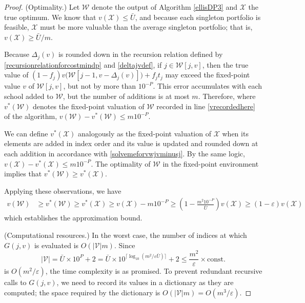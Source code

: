 \documentclass[12pt]{article} %
\theoremstyle{definition}
\theoremstyle{definition}
\begin{document}
\begin{proof}
(Optimality.) Let $\mathcal{W}$ denote the output of Algorithm \ref{ellisDP3} and $\mathcal{X}$ the true optimum. We know that $v(\mathcal{X}) \leq \bar U$, and because each singleton portfolio is feasible, $\mathcal{X}$ must be more valuable than the average singleton portfolio; that is, $v(\mathcal{X}) \geq \bar U / m$. 

Because $\Delta_j(v)$ is rounded down in the recursion relation defined by \eqref{recursionrelationforcostmindp} and \eqref{deltajvdef}, if $j \in \mathcal{W}[j, v]$, then the true value of $(1 - f_j) v\bigl(\mathcal{W}[j-1, v- \Delta_j(v)]\bigr) + f_j t_j$ may exceed the fixed-point value $v$ of $\mathcal{W}[j, v]$, but not by more than $10^{-P}$. This error accumulates with each school added to $\mathcal{W}$, but the number of additions is at most $m$. Therefore, where $v^*(\mathcal{W})$ denotes the fixed-point valuation of $\mathcal{W}$ recorded in line \ref{vrecordedhere} of the algorithm, 
$v(\mathcal{W}) - v^*(\mathcal{W}) \leq m 10^{-P}$.

We can define $v^*(\mathcal{X})$ analogously as the fixed-point valuation of $\mathcal{X}$ when its elements are added in index order and its value is updated and rounded down at each addition in accordance with \eqref{solvemeforvwjvminusj}. By the same logic, 
$v(\mathcal{X}) - v^*(\mathcal{X}) \leq m 10^{-P}$. The optimality of $\mathcal{W}$ in the fixed-point environment implies that $v^*(\mathcal{W}) \geq v^*(\mathcal{X})$. 

Applying these observations, we have
\begin{equation}
\begin{split}
v(\mathcal{W}) &\geq v^*(\mathcal{W}) \geq v^*(\mathcal{X})
\geq v(\mathcal{X}) - m 10^{-P}
\geq \left(1 - \frac{m^2 10^{-P}}{\bar U}\right) v(\mathcal{X})
\geq \left(1 - \varepsilon\right) v(\mathcal{X})
\end{split}
\end{equation}
which establishes the approximation bound. 

(Computational resources.) In the worst case, the number of indices at which $G(j, v)$ is evaluated is $O(|\mathcal{V}| m)$. Since
\begin{equation}
|\mathcal{V}| = \bar U \times 10^{P} + 2 = \bar U \times 10^ { \bigl\lceil\log_{10}\left(m ^2/ \varepsilon \bar U\right)\bigr\rceil} + 2
\leq\frac{m^2}{\varepsilon} \times \text{const.}
\end{equation}
is $O(m^2/ \varepsilon)$, the time complexity is as promised. To prevent redundant recursive calls to $G(j, v)$, we need to record its values in a dictionary as they are computed; the space required by the dictionary is $O(|\mathcal{V}| m) = O(m^3 / \varepsilon)$.
\end{proof}
\end{document}
